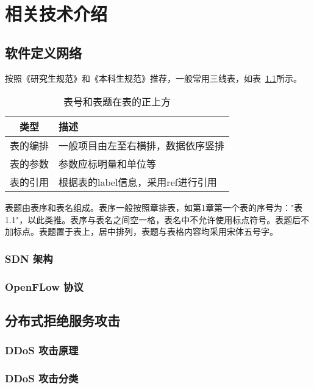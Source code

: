 
\chapter{相关技术介绍}

\section{软件定义网络}
按照《研究生规范》和《本科生规范》推荐，一般常用三线表，如表~\ref{tab:exampletable}所示。
\begin{table}[htbp]
  \centering
  \caption{表号和表题在表的正上方}
  \label{tab:exampletable}
  \begin{tabular}{cl}
    \toprule
    类型   & 描述                                       \\
    \midrule
    表的编排 & 一般项目由左至右横排，数据依序竖排 \\
    表的参数 & 参数应标明量和单位等   \\
    表的引用 & 根据表的label信息，采用ref进行引用       \\
    \bottomrule
  \end{tabular}
\end{table}

表题由表序和表名组成。表序一般按照章排表，如第1章第一个表的序号为："表1.1"，以此类推。表序与表名之间空一格，表名中不允许使用标点符号。表题后不加标点。表题置于表上，居中排列，表题与表格内容均采用宋体五号字。

\subsection{SDN 架构}
\subsection{OpenFLow 协议}

\section{分布式拒绝服务攻击}
\subsection{DDoS 攻击原理}
\subsection{DDoS 攻击分类}
